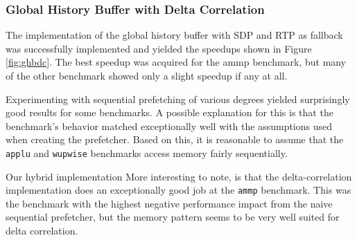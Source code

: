 \begin{figure*}
  
  \caption{Performance of RPT prefetcher across benchmarks.}
  \label{fig:rpt}
\end{figure*}

\subsubsection{Global History Buffer with Delta Correlation}
The implementation of the global history buffer with SDP and RTP as fallback was successfully implemented and yielded the speedups shown in Figure \ref{fig:ghbdc}.
The best speedup was acquired for the ammp benchmark, but many of the other benchmark showed only a slight speedup if any at all.


\begin{figure*}
  
  \caption{Speedup of each benchmark as a function of degree for the global history buffer with delta correlation and fall back to SDP and RTP.}
  \label{fig:ghbdc}
\end{figure*}

\begin{figure*}
  
  \caption{Average speedup as a function of prefetching degree for our final prefetcher implementation.}
  \label{fig:ghbdcavg}
\end{figure*}


Experimenting with sequential prefetching of various degrees yielded surprisingly good results for some benchmarks.
A possible explanation for this is that the benchmark's behavior matched exceptionally well with the assumptions used when creating the prefetcher.
Based on this, it is reasonable to assume that the \texttt{applu} and \texttt{wupwise} benchmarks access memory fairly sequentially.


Our hybrid implementation
More interesting to note, is that the delta-correlation implementation does an exceptionally good job at the \texttt{ammp} benchmark.
This was the benchmark with the highest negative performance impact from the naive sequential prefetcher, but the memory pattern seems to be very well suited for delta correlation.
